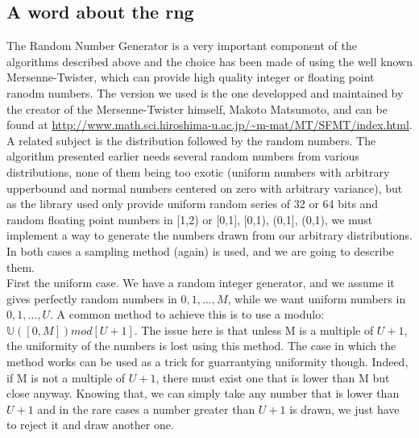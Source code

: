 \subsection{A word about the rng}
	The Random Number Generator is a very important component of the algorithms described above and the choice has been made of using the well known Mersenne-Twister, which can provide high quality integer or floating point ranodm numbers. The version we used is the one developped and maintained by the creator of the Mersenne-Twister himself, Makoto Matsumoto, and can be found at \url{http://www.math.sci.hiroshima-u.ac.jp/~m-mat/MT/SFMT/index.html}.\\\indent
	A related subject is the distribution followed by the random numbers. The algorithm presented earlier needs several random numbers from various distributions, none of them being too exotic (uniform numbers with arbitrary upperbound and normal numbers centered on zero with arbitrary variance), but as the library used only provide uniform random series of 32 or 64 bits and random floating point numbers in [1,2) or {[0,1], [0,1), (0,1], (0,1)}, we must implement a way to generate the numbers drawn from our arbitrary distributions. In both cases a sampling method (again) is used, and we are going to describe them.\\\indent
	First the uniform case. We have a random integer generator, and we assume it gives perfectly random numbers in $ {0, 1, ..., M} $, while we want uniform numbers in $ {0, 1, ..., U} $. A common method to achieve this is to use a modulo: $ \mathbb{U}([0, M]) mod[U+1] $. The issue here is that unless M is a multiple of $ U+1 $, the uniformity of the numbers is lost using this method. The case in which the method works can be used as a trick for guarrantying uniformity though. Indeed, if M is not a multiple of $ U+1 $, there must exist one that is lower than M but close anyway. Knowing that, we can simply take any number that is lower than $ U+1 $ and in the rare cases a number greater than $ U+1 $ is drawn, we just have to reject it and draw another one.\\\indent
